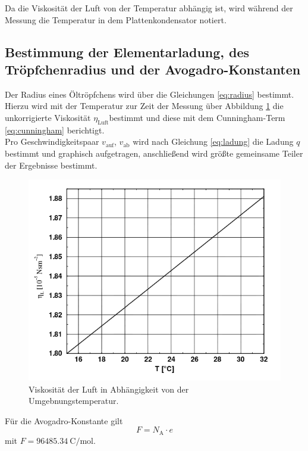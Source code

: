 Da die Viskosität der Luft von der Temperatur abhängig ist,
wird während der Messung  die Temperatur in dem Plattenkondensator notiert.

\subsection{Bestimmung der Elementarladung, des Tröpfchenradius und der Avogadro-Konstanten}
Der Radius eines Öltröpfchens wird über die Gleichungen \eqref{eq:radius} bestimmt.
Hierzu wird mit der Temperatur zur Zeit der Messung über Abbildung 
\ref{fig:temp} die unkorrigierte Viskosität $\eta_\text{Luft}$bestimmt und diese mit dem Cunningham-Term \eqref{eq:cunningham}
berichtigt.\\
Pro Geschwindigkeitspaar $v_\text{auf}$, $v_\text{ab}$  wird nach Gleichung \eqref{eq:ladung} die Ladung $q$ bestimmt und  graphisch aufgetragen, anschließend wird größte gemeinsame Teiler der Ergebnisse bestimmt.

\begin{figure}[p]
	\includegraphics[width=\textwidth]{Bilder/Temp.png}
	\caption{Viskosität der Luft in Abhängigkeit von der Umgebnungstemperatur. \cite{skript}}
	\label{fig:temp}
\end{figure}


Für die Avogadro-Konstante gilt
\begin{equation}
	F=N_\text{A}\cdot e
\end{equation}
mit $F=\SI{96485.34}{\coulomb\per\mol}$.